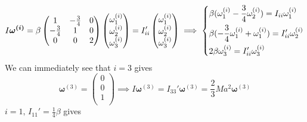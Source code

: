 \documentclass{article}
\begin{document}
        \begin{equation*}
            I \boldsymbol{\omega^{(i)}} = \beta
            \begin{pmatrix}
                1 & -\frac{3}{4}  & 0 \\
                -\frac{3}{4}  & 1 & 0 \\
                0 & 0 & 2  \\
            \end{pmatrix}
            \begin{pmatrix*}
                \omega^{(i)}_1 \\
                \omega^{(i)}_2 \\
                \omega^{(i)}_3 \\
            \end{pmatrix*}
            = 
            I'_{ii}
            \begin{pmatrix*}
                \omega^{(i)}_1 \\
                \omega^{(i)}_2 \\
                \omega^{(i)}_3 \\
            \end{pmatrix*}
        \implies
        \begin{dcases*}
            \beta (\omega^{(i)}_1 - \frac{3}{4} \omega^{(i)}_2) = I_{ii}\omega^{(i)}_1 \\
            \beta (- \frac{3}{4} \omega^{(i)}_1 + \omega^{(i)}_1) = I_{ii}'\omega^{(i)}_2 \\
            2 \beta \omega^{(i)}_3 = I_{ii}' \omega^{(i)}_3
        \end{dcases*}
        \end{equation*}
        We can immediately see that $i = 3$ gives
        \begin{equation*}
            \boldsymbol{\omega}^{(3)} = 
            \begin{pmatrix}
                0 \\
                0 \\
                1 \\
            \end{pmatrix}
            \implies I \boldsymbol{\omega}^{(3)} = I_{33}' \boldsymbol{\omega}^{(3)}  = \frac{2}{3} Ma^2 \boldsymbol{\omega}^{(3)} 
        \end{equation*}
        $i= 1, \, I_{11}' = \frac{1}{4}\beta$ gives
\end{document}

